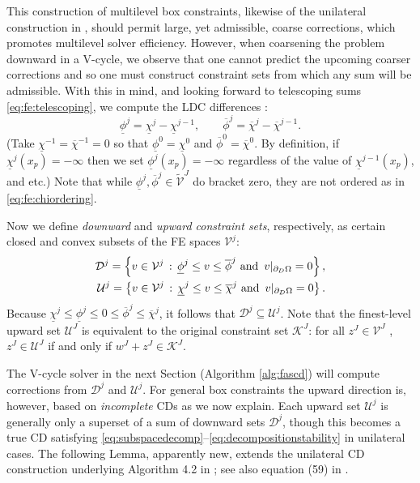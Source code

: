 \documentclass[review,hidelinks,onefignum,onetabnum,final]{siamart220329}  %
\begin{document}
This construction of multilevel box constraints, likewise of the unilateral construction in \cite{GraeserKornhuber2009}, should permit large, yet admissible, coarse corrections, which promotes multilevel solver efficiency.  However, when coarsening the problem downward in a V-cycle, we observe that one cannot predict the upcoming coarser corrections and so one must construct constraint sets from which any sum will be admissible.  With this in mind, and looking forward to telescoping sums \eqref{eq:fe:telescoping}, we compute the LDC differences \cite{GraeserKornhuber2009}:
\begin{equation}
\underline{\phi}^j = \underline{\chi}^j - \underline{\chi}^{j-1}, \qquad \overline{\phi}^j = \overline{\chi}^j - \overline{\chi}^{j-1}.  \label{eq:fe:philevels}
\end{equation}
(Take $\underline{\chi}^{-1}=\overline{\chi}^{-1}=0$ so that $\underline{\phi}^0=\underline{\chi}^0$ and $\overline{\phi}^0=\overline{\chi}^0$.  By definition, if $\underline{\chi}^j(x_p)=-\infty$ then we set $\underline{\phi}^j(x_p)=-\infty$ regardless of the value of $\underline{\chi}^{j-1}(x_p)$, and etc.)  Note that while $\underline{\phi}^{j},\overline{\phi}^{j} \in \tilde{\mathcal{V}}^J$ do bracket zero, they are not ordered as in \eqref{eq:fe:chiordering}.

Now we define \emph{downward} and \emph{upward constraint sets}, respectively, as certain closed and convex subsets of the FE spaces $\mathcal{V}^j$:
\begin{align}
\mathcal{D}^j = \left\{v \in \mathcal{V}^j \,:\, \underline{\phi}^j \le v \le \overline{\phi}^j \text{ and } \, v|_{\partial_D\Omega} = 0\right\}, \label{eq:fe:constraintsets} \\
\mathcal{U}^j = \left\{v \in \mathcal{V}^j \,:\, \underline{\chi}^j \le v \le \overline{\chi}^j \text{ and } \, v|_{\partial_D\Omega} = 0\right\}. \notag
\end{align}
Because $\underline{\chi}^j \le \underline{\phi}^j \le 0 \le \overline{\phi}^j \le \overline{\chi}^j$, it follows that $\mathcal{D}^j \subseteq \mathcal{U}^j$.  Note that the finest-level upward set $\mathcal{U}^J$ is equivalent to the original constraint set $\mathcal{K}^J$: for all $z^J \in \mathcal{V}^J$ , $z^J \in \mathcal{U}^J$ if and only if $w^J+z^J \in \mathcal{K}^J$.

The V-cycle solver in the next Section (Algorithm \ref{alg:fascd}) will compute corrections from $\mathcal{D}^j$ and $\mathcal{U}^j$.  For general box constraints the upward direction is, however, based on \emph{incomplete} CDs as we now explain.  Each upward set $\mathcal{U}^j$ is generally only a superset of a sum of downward sets $\mathcal{D}^j$, though this becomes a true CD satisfying \eqref{eq:subspacedecomp}--\eqref{eq:decompositionstability} in unilateral cases.  The following Lemma, apparently new, extends the unilateral CD construction underlying Algorithm 4.2 in \cite{GraeserKornhuber2009}; see also equation (59) in \cite{Tai2003}.
\end{document}
